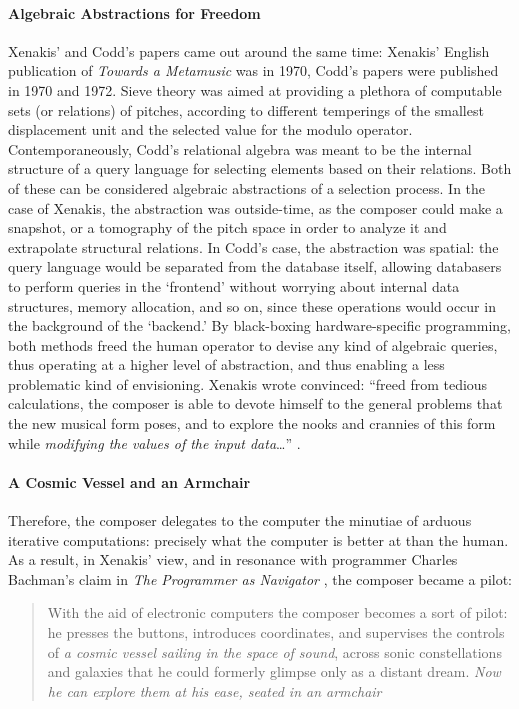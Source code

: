 \paragraph{Algebraic Abstractions for Freedom}
Xenakis' and Codd's papers came out around the same time: Xenakis' English publication of \textit{Towards a Metamusic} was in 1970, Codd's papers were published in 1970 and 1972. Sieve theory was aimed at providing a plethora of computable sets (or relations) of pitches, according to different temperings of the smallest displacement unit and the selected value for the modulo operator. Contemporaneously, Codd's relational algebra was meant to be the internal structure of a query language for selecting elements based on their relations. Both of these can be considered algebraic abstractions of a selection process. In the case of Xenakis, the abstraction was outside-time, as the composer could make a snapshot, or a tomography of the pitch space in order to analyze it and extrapolate structural relations. In Codd's case, the abstraction was spatial: the query language would be separated from the database itself, allowing databasers to perform queries in the `frontend' without worrying about internal data structures, memory allocation, and so on, since these operations would occur in the background of the `backend.' By black-boxing hardware-specific programming, both methods freed the human operator to devise any kind of algebraic queries, thus operating at a higher level of abstraction, and thus enabling a less problematic kind of envisioning. Xenakis wrote convinced: ``freed from tedious calculations, the composer is able to devote himself to the general problems that the new musical form poses, and to explore the nooks and crannies of this form while \textit{modifying the values of the input data}\dots'' \im \parencite[144]{Xen92:For}.

\paragraph{A Cosmic Vessel and an Armchair}
Therefore, the composer delegates to the computer the minutiae of arduous iterative computations: precisely what the computer is better at than the human. As a result, in Xenakis' view, and in resonance with programmer Charles Bachman's claim in \textit{The Programmer as Navigator} \parencite{Bachman:1973:PN:355611.362534}, the composer became a pilot:

\begin{quote}
	With the aid of electronic computers the composer becomes a sort of pilot: he presses the buttons, introduces coordinates, and supervises the controls of \textit{a cosmic vessel sailing in the space of sound}, across sonic constellations and galaxies that he could formerly glimpse only as a distant dream. \textit{Now he can explore them at his ease, seated in an armchair} \im \parencite[144]{Xen92:For}
\end{quote}

